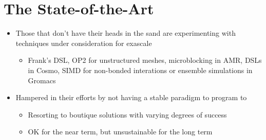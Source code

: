\section{The State-of-the-Art}
\begin{itemize}
  \item Those that don't have their heads in the sand are experimenting with techniques under consideration for exascale
    \begin{itemize}
      \item Frank's DSL, OP2 for unstructured meshes, microblocking in AMR, DSLs in Cosmo, SIMD for non-bonded interations or ensemble
     simulations in Gromacs 
    \end{itemize}
  \item Hampered in their efforts by not having a stable paradigm to program to 
    \begin{itemize}
      \item Resorting to boutique solutions with varying degrees of success
      \item OK for the near term, but unsustainable for the long term
    \end{itemize}
\end{itemize}

